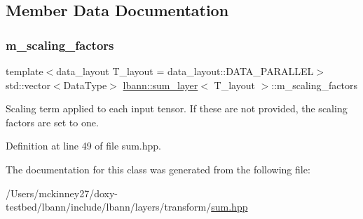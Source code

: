 \subsection{Member Data Documentation}
\mbox{\label{classlbann_1_1sum__layer_a371ae9038d8654fbca134e0f61e1e29a}} 
\subsubsection{\texorpdfstring{m\+\_\+scaling\+\_\+factors}{m\_scaling\_factors}}
{\footnotesize\ttfamily template$<$data\+\_\+layout T\+\_\+layout = data\+\_\+layout\+::\+D\+A\+T\+A\+\_\+\+P\+A\+R\+A\+L\+L\+EL$>$ \\
std\+::vector$<$Data\+Type$>$ \hyperlink{classlbann_1_1sum__layer}{lbann\+::sum\+\_\+layer}$<$ T\+\_\+layout $>$\+::m\+\_\+scaling\+\_\+factors\hspace{0.3cm}{\ttfamily [private]}}

Scaling term applied to each input tensor. If these are not provided, the scaling factors are set to one. 

Definition at line 49 of file sum.\+hpp.



The documentation for this class was generated from the following file\+:\begin{DoxyCompactItemize}
\item 
/\+Users/mckinney27/doxy-\/testbed/lbann/include/lbann/layers/transform/\hyperlink{sum_8hpp}{sum.\+hpp}\end{DoxyCompactItemize}
